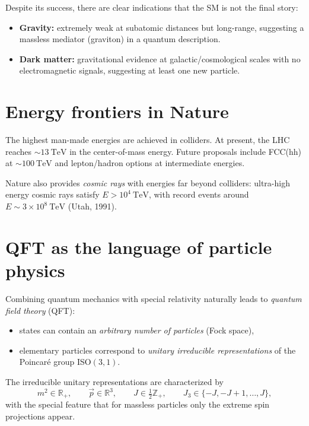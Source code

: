 Despite its success, there are clear indications that the SM is not the final story:
\begin{itemize}
  \item \textbf{Gravity:} extremely weak at subatomic distances but long-range, suggesting a massless mediator (graviton) in a quantum description.
  \item \textbf{Dark matter:} gravitational evidence at galactic/cosmological scales with no electromagnetic signals, suggesting at least one new particle.
\end{itemize}

\section{Energy frontiers in Nature}
The highest man-made energies are achieved in colliders. At present, the LHC reaches
$\sim 13~\text{TeV}$ in the center-of-mass energy. Future proposals include FCC(hh) at
$\sim 100~\text{TeV}$ and lepton/hadron options at intermediate energies.

Nature also provides \emph{cosmic rays} with energies far beyond colliders:
ultra-high energy cosmic rays satisfy $E>10^4~\text{TeV}$, with record events around
$E\sim 3\times 10^8~\text{TeV}$ (Utah, 1991).

\section{QFT as the language of particle physics}
Combining quantum mechanics with special relativity naturally leads to
\emph{quantum field theory} (QFT):
\begin{itemize}
  \item states can contain an \emph{arbitrary number of particles} (Fock space),
  \item elementary particles correspond to \emph{unitary irreducible representations} of the
  Poincar\'e group ISO$(3,1)$.
\end{itemize}
The irreducible unitary representations are characterized by
\begin{equation}
m^2 \in \mathbb{R}_+,\qquad \vec p\in \mathbb{R}^3,\qquad J\in \tfrac{1}{2}\mathbb{Z}_+,\qquad
J_3\in\{-J,-J+1,\dots,J\},
\end{equation}
with the special feature that for massless particles only the extreme spin projections appear.

